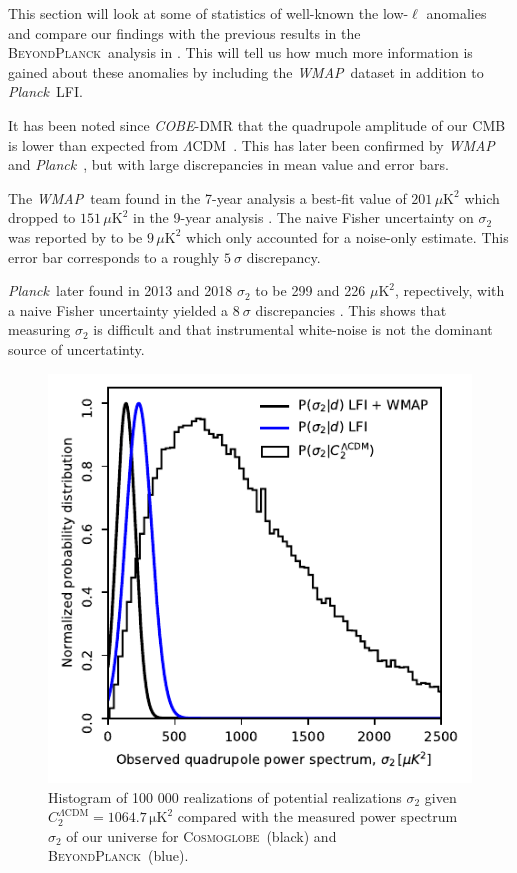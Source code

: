 \documentclass[twocolumn]{../../common/aa}
\def\WMAP{\emph{WMAP}}
\def\COBE{\emph{COBE}}
\def\planck{\emph{Planck}}
\def\Planck{\emph{Planck}}
\def\LCDM{$\Lambda$CDM}
\newcommand{\BP}{\textsc{BeyondPlanck}}
\newcommand{\bp}{\textsc{BeyondPlanck}}
\newcommand{\Cosmoglobe}{\textsc{Cosmoglobe}}
\begin{document}
This section will look at some of statistics of well-known the low-$\ell$ anomalies and compare our findings with the previous  results in the \bp\ analysis in \citet{bp11}. This will tell us how much more information is gained about these anomalies by including the \WMAP\ dataset in addition to \Planck\ LFI.

It has been noted since \COBE-DMR that the quadrupole amplitude of our CMB is lower than expected from \LCDM\ \citep{bennett:1992}. This has later been confirmed by \WMAP\ \citep{hinshaw2003a} and \planck\ \citep{planck2013-XV}, but with large discrepancies in mean value and error bars.


The \WMAP\ team found in the 7-year analysis a best-fit value of $201\,\mu\mathrm{K}^2$ \citep{larson2010} which dropped to $151\,\mu\mathrm{K}^2$ in the 9-year analysis \citep{hinshaw2012}. The naive Fisher uncertainty on $\sigma_2$ was reported by \citet{hinshaw2012} to be $9\,\mu \mathrm{K}^2$ which only accounted for a noise-only estimate. This error bar corresponds to a roughly $5~\sigma$ discrepancy.

\Planck\ later found in 2013 and 2018 $\sigma_2$ to be 299 and 226 $\mu \mathrm{K}^2$, repectively, with a naive Fisher uncertainty yielded a $8~\sigma$ discrepancies \citep{planck2016-l05}. This shows that measuring $\sigma_2$ is difficult and that instrumental white-noise is not the dominant source of uncertatinty.

\begin{figure}
	\includegraphics[width=\columnwidth]{figures/WMAP_P_sig_d_c.pdf}
	\caption{Histogram of 100 000 realizations of potential realizations $\sigma_2$ given ${C_2^{\Lambda \mathrm{CDM}} = 1064.7\,\mathrm{\mu K^2}}$ compared with the measured power spectrum $\sigma_2$ of our universe for \Cosmoglobe\ (black) and \BP\ (blue).}
	\label{fig:sigma_2_hist}
\end{figure}
\end{document}
